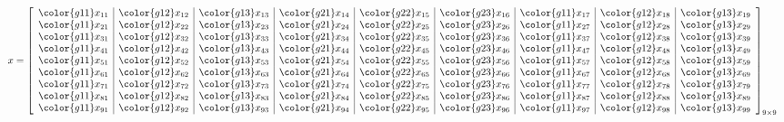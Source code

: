 \begin{align*}
x &= \left[
      \begin{array}{l|l|l|l|l|l|l|l|l}
      \color{g11}x_{11} & \color{g12}x_{12} & \color{g13}x_{13} & \color{g21}x_{14} & \color{g22}x_{15} & \color{g23}x_{16} & \color{g11}x_{17} & \color{g12}x_{18} & \color{g13}x_{19}\\
      \color{g11}x_{21} & \color{g12}x_{22} & \color{g13}x_{23} & \color{g21}x_{24} & \color{g22}x_{25} & \color{g23}x_{26} & \color{g11}x_{27} & \color{g12}x_{28} & \color{g13}x_{29}\\
      \color{g11}x_{31} & \color{g12}x_{32} & \color{g13}x_{33} & \color{g21}x_{34} & \color{g22}x_{35} & \color{g23}x_{36} & \color{g11}x_{37} & \color{g12}x_{38} & \color{g13}x_{39}\\
      \color{g11}x_{41} & \color{g12}x_{42} & \color{g13}x_{43} & \color{g21}x_{44} & \color{g22}x_{45} & \color{g23}x_{46} & \color{g11}x_{47} & \color{g12}x_{48} & \color{g13}x_{49}\\
      \color{g11}x_{51} & \color{g12}x_{52} & \color{g13}x_{53} & \color{g21}x_{54} & \color{g22}x_{55} & \color{g23}x_{56} & \color{g11}x_{57} & \color{g12}x_{58} & \color{g13}x_{59}\\
      \color{g11}x_{61} & \color{g12}x_{62} & \color{g13}x_{63} & \color{g21}x_{64} & \color{g22}x_{65} & \color{g23}x_{66} & \color{g11}x_{67} & \color{g12}x_{68} & \color{g13}x_{69}\\
      \color{g11}x_{71} & \color{g12}x_{72} & \color{g13}x_{73} & \color{g21}x_{74} & \color{g22}x_{75} & \color{g23}x_{76} & \color{g11}x_{77} & \color{g12}x_{78} & \color{g13}x_{79}\\
      \color{g11}x_{81} & \color{g12}x_{82} & \color{g13}x_{83} & \color{g21}x_{84} & \color{g22}x_{85} & \color{g23}x_{86} & \color{g11}x_{87} & \color{g12}x_{88} & \color{g13}x_{89}\\
      \color{g11}x_{91} & \color{g12}x_{92} & \color{g13}x_{93} & \color{g21}x_{94} & \color{g22}x_{95} & \color{g23}x_{96} & \color{g11}x_{97} & \color{g12}x_{98} & \color{g13}x_{99}\\
      \end{array}
\right]_{9\times 9}
\end{align*}

